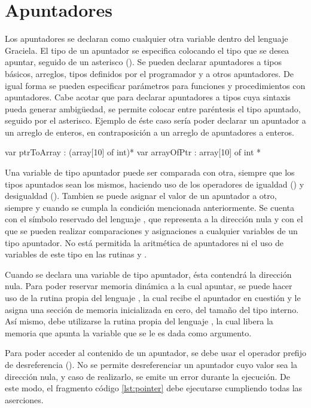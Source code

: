 \section{Apuntadores}

Los apuntadores se declaran como cualquier otra variable dentro del lenguaje
Graciela. El tipo de un apuntador se especifica colocando el tipo que se desea
apuntar, seguido de un asterisco (\ingra{*}). Se pueden declarar apuntadores a
tipos básicos, arreglos, tipos definidos por el programador y a otros
apuntadores. De igual forma se pueden especificar parámetros para funciones y
procedimientos con apuntadores. Cabe acotar que para declarar apuntadores a
tipos cuya sintaxis pueda generar ambigüedad, se permite colocar entre
paréntesis el tipo apuntado, seguido por el asterisco. Ejemplo de éste caso
sería poder declarar un apuntador a un arreglo de enteros, en contraposición a
un arreglo de apuntadores a enteros.

\begin{gracielacode}[caption=Ejemplo de arreglo de apuntadores y apuntar a arreglo, label=lst:arrPtr]
var ptrToArray : (array[10] of int)*
var arrayOfPtr :  array[10] of int *
\end{gracielacode}

Una variable de tipo apuntador puede ser comparada con otra, siempre que los
tipos apuntados sean los mismos, haciendo uso de los operadores de igualdad
(\ingra{==}) y desigualdad (\ingra{!=}). Tambien se puede asignar el valor
de un apuntador a otro, siempre y cuando se cumpla la condición mencionada
anteriormente. Se cuenta con el símbolo reservado del lenguaje
, que representa a la dirección nula y con el que se pueden
realizar comparaciones y asignaciones a cualquier variables de un
tipo apuntador. No está permitida la aritmética de apuntadores ni el uso de
variables de este tipo en las rutinas  y .

Cuando se declara una variable de tipo apuntador, ésta contendrá la dirección
nula. Para poder reservar memoria dinámica a la cual apuntar, se puede hacer
uso de la rutina propia del lenguaje , la cual recibe el apuntador
en cuestión y le asigna una sección de memoria inicializada en cero, del
tamaño del tipo interno. Así mismo, debe utilizarse la rutina propia del
lenguaje , la cual libera la memoria que apunta la variable que
se le es dada como argumento.

Para poder acceder al contenido de un apuntador, se debe usar el operador
prefijo de desreferencia (\ingra{*}). No se permite desreferenciar un
apuntador cuyo valor sea la dirección nula, y caso de realizarlo, se emite un
error durante la ejecución. De este modo, el fragmento código
\ref{lst:pointer} debe ejecutarse cumpliendo todas las aserciones.

